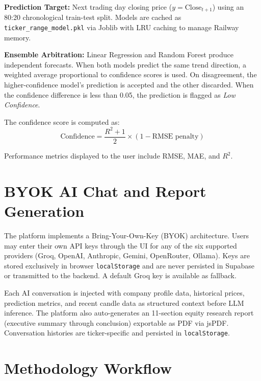 \documentclass{book}
\begin{document}
\par\noindent \textbf{Prediction Target:} Next trading day closing price ($y = \text{Close}_{t+1}$) using an 80:20 chronological train-test split. Models are cached as \texttt{ticker\_range\_model.pkl} via Joblib with LRU caching to manage Railway memory.

\par\noindent \textbf{Ensemble Arbitration:} Linear Regression and Random Forest produce independent forecasts. When both models predict the same trend direction, a weighted average proportional to confidence scores is used. On disagreement, the higher-confidence model's prediction is accepted and the other discarded. When the confidence difference is less than 0.05, the prediction is flagged as \textit{Low Confidence}.

The confidence score is computed as:
\begin{equation}
  \text{Confidence} = \frac{R^2 + 1}{2} \times \left(1 - \text{RMSE penalty}\right)
\end{equation}

\par\noindent Performance metrics displayed to the user include RMSE, MAE, and $R^2$.

\section{BYOK AI Chat and Report Generation}

\par\noindent The platform implements a Bring-Your-Own-Key (BYOK) architecture. Users may enter their own API keys through the UI for any of the six supported providers (Groq, OpenAI, Anthropic, Gemini, OpenRouter, Ollama). Keys are stored exclusively in browser \texttt{localStorage} and are never persisted in Supabase or transmitted to the backend. A default Groq key is available as fallback.

\par\noindent Each AI conversation is injected with company profile data, historical prices, prediction metrics, and recent candle data as structured context before LLM inference. The platform also auto-generates an 11-section equity research report (executive summary through conclusion) exportable as PDF via jsPDF. Conversation histories are ticker-specific and persisted in \texttt{localStorage}.

\section{Methodology Workflow}
\end{document}
